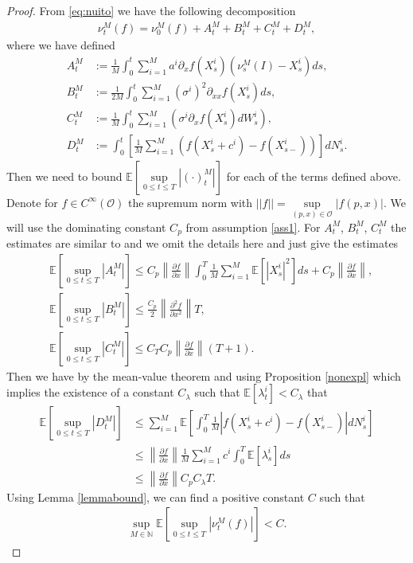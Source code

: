 \documentclass[10pt]{article}
\theoremstyle{plain}
\theoremstyle{definition}
\newcommand{\<}{\langle}
\renewcommand{\>}{\rangle}
\renewcommand{\(}{\left(}
\renewcommand{\)}{\right)}
\renewcommand{\[}{\left[}
\renewcommand{\]}{\right]}
\begin{document}
\begin{proof}
From \eqref{eq:nuito} we have the following decomposition
\begin{align}\label{eq:nudecomp}
\nu^M_t(f) = \nu_0^M(f) + A_t^M + B_t^M + C_t^M + D_t^M,
\end{align}
where we have defined
\begin{align}\label{eq:defops}
A_t^M&:=\frac{1}{M}\int_0^t\sum\limits_{i=1}^Ma^i\partial_x f(X_s^i)(\nu_s^M(I)-X_s^i)ds,\\
B_t^M&:=\frac{1}{2M}\int_0^t\sum\limits_{i=1}^M(\sigma^i)^2\partial_{xx}f(X_s^i)ds,\\ C_t^M&:=
\frac{1}{M}\int_0^t\sum\limits_{i=1}^M\left(\sigma^i\partial_xf(X_s^i)dW_s^i\right),\\
D_t^M&:=\int_0^t\left[\frac{1}{M}\sum\limits_{i=1}^M(f(X_s^i+c^i)-f(X_{s-}^i))\right]dN_s^i.
\end{align}
Then we need to bound $\mathbb{E}\left[\sup\limits_{0\leq t\leq T}|(\cdot)_t^M|\right]$ for each
of the terms defined above. Denote for $f\in C^\infty(\mathcal{O})$ the supremum norm with
$||f||=\sup\limits_{(p,x)\in\mathcal{O}}|f(p,x)|$. We will use the dominating constant $C_p$ from
assumption \ref{ass1}. For $A_t^M$, $B_t^M$, $C_t^M$ the estimates are similar to
\citet{capponi15} and we omit the details here and just give the estimates
\begin{align}
&\mathbb{E}\left[\sup\limits_{0\leq t\leq T}|A_t^M|\right]\leq C_p\left\|\frac{\partial
f}{\partial x}\right\|\int_0^T\frac{1}{M}\sum\limits_{i=1}^M\mathbb{E}\left[|X_s^i|^2\right]ds +
C_p\left\|\frac{\partial f}{\partial x}\right\|,\\ &\mathbb{E}\left[\sup\limits_{0\leq t\leq
T}|B_t^M|\right]\leq \frac{C_p}{2}\left\|\frac{\partial^2 f}{\partial x^2}\right\|T,\\
&\mathbb{E}\left[\sup\limits_{0\leq t\leq T}|C_t^M|\right]\leq C_TC_p\left\|\frac{\partial
f}{\partial x}\right\|(T+1).
\end{align}
Then we have by the mean-value theorem and using Proposition \ref{nonexpl} which implies the
existence of a constant $C_\lambda$ such that $\mathbb{E}[\lambda^i_t]<C_\lambda$ that
\begin{align}
\mathbb{E}\left[\sup\limits_{0\leq t\leq T}|D_t^M|\right]&\leq
\sum\limits_{i=1}^M\mathbb{E}\left[\int_0^T\frac{1}{M}|f(X_s^i+c^i)-f(X_{s-}^i)|dN_s^i\right]\\
&\leq \left\|\frac{\partial f}{\partial
x}\right\|\frac{1}{M}\sum\limits_{i=1}^Mc^i\int_0^T\mathbb{E}[\lambda_s^i]ds\\ &\leq
\left\|\frac{\partial f}{\partial x}\right\| C_pC_\lambda T.
\end{align}
Using Lemma \ref{lemmabound}, we can find a positive constant $C$ such that
\begin{align}
\sup\limits_{M\in\mathbb{N}}\mathbb{E}\left[\sup\limits_{0\leq t\leq
T}\left|\nu_t^M(f)\right|\right]<C.
\end{align}
\end{proof}
\end{document}
